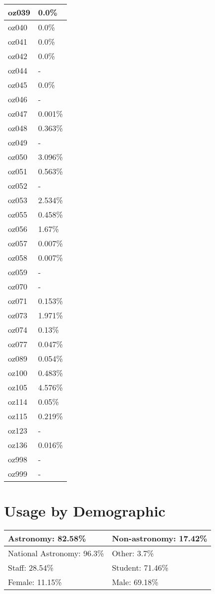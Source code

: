 \documentclass{article}%
\begin{document}
\begin{longtabu}{X[l] X[r]}
\hline%
oz039&0.0\%\\%
\hline%
oz040&0.0\%\\%
\hline%
oz041&0.0\%\\%
\hline%
oz042&0.0\%\\%
\hline%
oz044&{-}\\%
\hline%
oz045&0.0\%\\%
\hline%
oz046&{-}\\%
\hline%
oz047&0.001\%\\%
\hline%
oz048&0.363\%\\%
\hline%
oz049&{-}\\%
\hline%
oz050&3.096\%\\%
\hline%
oz051&0.563\%\\%
\hline%
oz052&{-}\\%
\hline%
oz053&2.534\%\\%
\hline%
oz055&0.458\%\\%
\hline%
oz056&1.67\%\\%
\hline%
oz057&0.007\%\\%
\hline%
oz058&0.007\%\\%
\hline%
oz059&{-}\\%
\hline%
oz070&{-}\\%
\hline%
oz071&0.153\%\\%
\hline%
oz073&1.971\%\\%
\hline%
oz074&0.13\%\\%
\hline%
oz077&0.047\%\\%
\hline%
oz089&0.054\%\\%
\hline%
oz100&0.483\%\\%
\hline%
oz105&4.576\%\\%
\hline%
oz114&0.05\%\\%
\hline%
oz115&0.219\%\\%
\hline%
oz123&{-}\\%
\hline%
oz136&0.016\%\\%
\hline%
oz998&{-}\\%
\hline%
oz999&{-}\\%
\hline%
\end{longtabu}%
\section{Usage by Demographic}%

%
\begin{longtabu}{X[l] X[l]}%
Astronomy:  82.58\%&Non{-}astronomy:  17.42\%\\%
\hline%
National Astronomy:  96.3\%&Other:  3.7\%\\%
\hline%
Staff:  28.54\%&Student:  71.46\%\\%
\hline%
Female:  11.15\%&Male:  69.18\%\\%
\hline%
\end{longtabu}%
\end{document}
